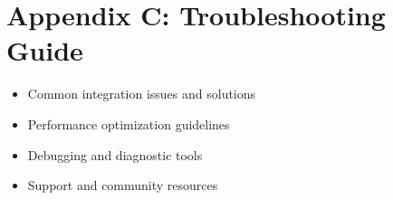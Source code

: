 \documentclass[12pt,a4paper]{article}
\begin{document}
\section{Appendix C: Troubleshooting Guide}
\begin{itemize}
    \item Common integration issues and solutions
    \item Performance optimization guidelines
    \item Debugging and diagnostic tools
    \item Support and community resources
\end{itemize}
\end{document}
